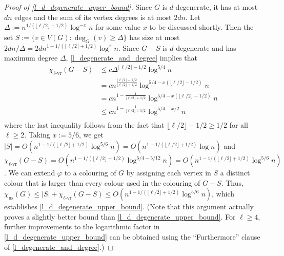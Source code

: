 \documentclass{patmorin}
\newcommand{\rn}[1]{\chi_{\operatorname{#1-vr}}}
\newcommand{\trn}{\chi_{\mathrm{us}}}
\newcommand{\lrn}{\rn{\ell}}
\newcommand{\texp}{1-1/(\lfloor\ell/2\rfloor+1/2)}
\newcommand{\dexp}{1-\frac{1}{\lfloor\ell/2\rfloor+1/2}}
\begin{document}
\begin{proof}[Proof of \cref{l_d_degenerate_upper_bound}]
  Since $G$ is $d$-degenerate, it has at most $dn$ edges and the sum of its vertex degrees is at most $2dn$.  Let $\Delta:=n^{1/(\lfloor\ell/2\rfloor+1/2)}\log^{-x} n$ for some value $x$ to be discussed shortly.  Then the set $S:=\{v\in V(G):\deg_G(v)\ge \Delta\}$ has size at most $2dn/\Delta=2dn^{\texp}\log^x n$.  Since $G-S$ is $d$-degenerate and has maximum degree $\Delta$, \cref{l_degenerate_and_degree} implies that
  \begin{align*}
    \lrn(G-S) &
    \le c\Delta^{\lfloor\ell/2\rfloor-1/2}\log^{5/4} n \\
    & = cn^{\frac{\lfloor\ell/2\rfloor-1/2}{\lfloor\ell/2\rfloor+1/2}}\log^{5/4-x(\lfloor\ell/2\rfloor-1/2)} n \\
    & = cn^{\dexp}\log^{5/4-x(\lfloor\ell/2\rfloor-1/2)} n \\
    & \le cn^{\dexp}\log^{5/4-x/2} n \\
  \end{align*}
  where the last inequality follows from the fact that $\lfloor\ell/2\rfloor-1/2\ge 1/2$ for all $\ell\ge 2$.  Taking $x:=5/6$, we get $|S|=O(n^{\texp}\log^{5/6} n)=O(n^{\texp}\log n)$ and  $\lrn(G-S)= O(n^{\texp}\log^{5/4-5/12} n)=O(n^{\texp}\log^{5/6} n)$.  We can extend $\varphi$ to a colouring of $G$ by assigning each vertex in $S$ a distinct colour that is larger than every colour used in the colouring of $G-S$.  Thus, $\trn(G)\le |S|+\lrn(G-S) \le O(n^{\texp}\log^{5/6} n)$, which establishes \cref{l_d_degenerate_upper_bound}.  (Note that this argument actually proves a slightly better bound than \cref{l_d_degenerate_upper_bound}.  For $\ell\ge 4$, further improvements to the logarithmic factor in \cref{l_d_degenerate_upper_bound} can be obtained using the ``Furthermore'' clause of \cref{l_degenerate_and_degree}.)
\end{proof}

%
\end{document}
